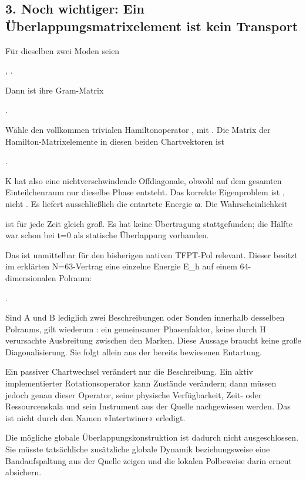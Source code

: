 \subsection{3. Noch wichtiger: Ein Überlappungsmatrixelement ist kein
Transport}\label{noch-wichtiger-ein-uxfcberlappungsmatrixelement-ist-kein-transport}

Für dieselben zwei Moden seien

, .

Dann ist ihre Gram-Matrix

.

Wähle den vollkommen trivialen Hamiltonoperator , mit
. Die Matrix der Hamilton-Matrixelemente in
diesen beiden Chartvektoren ist

.

K hat also eine nichtverschwindende Offdiagonale, obwohl auf dem
gesamten Einteilchenraum nur dieselbe Phase
 entsteht. Das korrekte Eigenproblem
ist , nicht . Es liefert
ausschließlich die entartete Energie ω. Die Wahrscheinlichkeit


ist für jede Zeit gleich groß. Es hat keine Übertragung stattgefunden;
die Hälfte war schon bei t=0 als statische Überlappung vorhanden.

Das ist unmittelbar für den bisherigen nativen TFPT-Pol relevant. Dieser
besitzt im erklärten N=63-Vertrag eine einzelne Energie E\_h auf einem
64-dimensionalen Polraum:

.

Sind A und B lediglich zwei Beschreibungen oder Sonden innerhalb
desselben Polraums, gilt wiederum : ein gemeinsamer
Phasenfaktor, keine durch H verursachte Ausbreitung zwischen den Marken.
Diese Aussage braucht keine große Diagonalisierung. Sie folgt allein aus
der bereits bewiesenen Entartung.

Ein passiver Chartwechsel verändert nur die Beschreibung. Ein aktiv
implementierter Rotationsoperator kann Zustände verändern; dann müssen
jedoch genau dieser Operator, seine physische Verfügbarkeit, Zeit- oder
Ressourcenskala und sein Instrument aus der Quelle nachgewiesen werden.
Das ist nicht durch den Namen »Intertwiner« erledigt.

Die mögliche globale Überlappungskonstruktion ist dadurch nicht
ausgeschlossen. Sie müsste tatsächliche zusätzliche globale Dynamik
beziehungsweise eine Bandaufspaltung aus der Quelle zeigen und die
lokalen Polbeweise darin erneut absichern.

